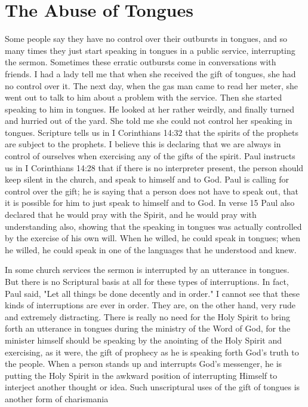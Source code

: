 \section*{The Abuse of Tongues}

Some people say they have no control over their outbursts in tongues, and so many times they just start speaking in tongues in a public service, interrupting the sermon. Sometimes these erratic outbursts come in conversations with friends. I had a lady tell me that when she received the gift of tongues, she had no control over it. The next day, when the gas man came to read her meter, she went out to talk to him about a problem with the service. Then she started speaking to him in tongues. He looked at her rather weirdly, and finally turned and hurried out of the yard. She told me she could not control her speaking in tongues. Scripture tells us in I Corinthians 14:32 that the spirits of the prophets are subject to the prophets. I believe this is declaring that we are always in control of ourselves when exercising any of the gifts of the spirit. Paul instructs us in I Corinthians 14:28 that if there is no interpreter present, the person should keep silent in the church, and speak to himself and to God. Paul is calling for control over the gift; he is saying that a person does not have to speak out, that it is possible for him to just speak to himself and to God. In verse 15 Paul also declared that he would pray with the Spirit, and he would pray with understanding also, showing that the speaking in tongues was actually controlled by the exercise of his own will. When he willed, he could speak in tongues; when he willed, he could speak in one of the languages that he understood and knew. 

In some church services the sermon is interrupted by an utterance in tongues. But there is no Scriptural basis at all for these types of interruptions. In fact, Paul said, "Let all things be done decently and in order." I cannot see that these kinds of interruptions are ever in order. They are, on the other hand, very rude and extremely distracting. There is really no need for the Holy Spirit to bring forth an utterance in tongues during the ministry of the Word of God, for the minister himself should be speaking by the anointing of the Holy Spirit and exercising, as it were, the gift of prophecy as he is speaking forth God's truth to the people. When a person stands up and interrupts God's messenger, he is putting the Holy Spirit in the awkward position of interrupting Himself to interject another thought or idea. Such unscriptural uses of the gift of tongues is another form of charismania 


